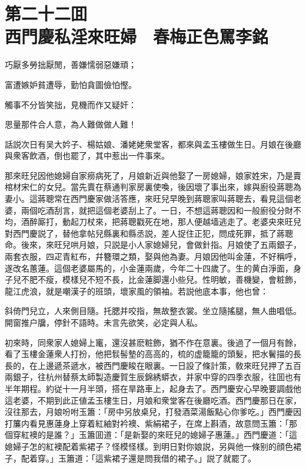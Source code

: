 
\chapter*{第二十二囬　\\西門慶私淫來旺婦　春梅正色罵李銘}


\begin{myquote}
巧厭多勞拙厭閒，善嫌懦弱惡嫌頑；

富遭嫉妒貧遭辱，勤怕貪圖儉怕慳。

觸事不分皆笑拙，見機而作又疑奸：

思量那件合人意，為人難做做人難！
\end{myquote}

話説次日有吴大妗子、楊姑娘、潘姥姥衆堂客，都來與孟玉樓做生日。月娘在後廳與衆客飲酒，倒也罷了，其中惹出一件事來。

那來旺兒因他媳婦自家癆病死了，月娘新近與他娶了一房媳婦，娘家姓宋，乃是賣棺材宋仁的女兒。當先賣在蔡通判家房裏使喚，後因壞了事出來，嫁與廚役蔣聰為妻小。這蔣聰常在西門慶家做活答應，來旺兒早晚到蔣聰家叫蔣聰去，看見這個老婆，兩個吃酒刮言，就把這個老婆刮上了。一日，不想這蔣聰因和一般廚役分財不均，酒醉廝打，動起刀杖來，把蔣聰戳死在地，那人便越墙逃走了。老婆央來旺兒對西門慶説了，替他拿帖兒縣裏和縣丞説，差人捉住正犯，問成死罪，抵了蔣聰命。後來，來旺兒哄月娘，只説是小人家媳婦兒，會做針指。月娘使了五兩銀子，兩套衣服，四疋青紅布，幷簪環之類，娶與他為妻。月娘因他叫金蓮，不好稱呼，遂改名蕙蓮。這個老婆屬馬的，小金蓮兩歲，今年二十四歲了。生的黄白淨面，身子兒不肥不瘦，模樣兒不短不長，比金蓮脚還小些兒。性明敏，善機變，會粧飾，龍江虎浪，就是嘲漢子的班頭，壞家風的領袖。若説他底本事，他也曾：

\begin{myquote}
斜倚門兒立，人來側目隨。托腮并咬指，無故整衣裳。坐立隨搖腿，無人曲唱低。開窗推户牖，停針不語時。未言先欲笑，必定與人私。
\end{myquote}

初來時，同衆家人媳婦上竃，還沒甚麽粧飾，猶不作在意裏。後過了一個月有餘，看了玉樓金蓮衆人打扮，他把䯼髻墊的高高的，梳的虚籠籠的頭髮，把水鬢描的長長的，在上邊遞茶遞水，被西門慶睃在眼裏。一日設了條計策，敎來旺兒押了五百兩銀子，往杭州替蔡太師製造慶賀生辰錦綉蟒衣，并家中穿的四季衣服，往囬也有半年期程。約従十一月半頭，搭在旱路車上，起身去了。西門慶安心早晚要調戲他這老婆，不期到此正値孟玉樓生日，月娘和衆堂客在後廳吃酒。西門慶那日在家，沒往那去，月娘吩咐玉簫：「房中另放桌兒，打發酒菜湯飯點心你爹吃。」西門慶因打簾内看見惠蓮身上穿着紅紬對衿襖、紫絹裙子，在席上斟酒，故意問玉簫：「那個穿紅襖的是誰？」玉簫囬道：「是新娶的來旺兒的媳婦子惠蓮。」西門慶道：「這媳婦子怎的紅襖配着紫裙子？怪模怪樣。到明日對你娘説，另與他一條别的顔色裙子，配着穿。」玉簫道：「這紫裙子還是問我借的裙子。」説了就罷了。

